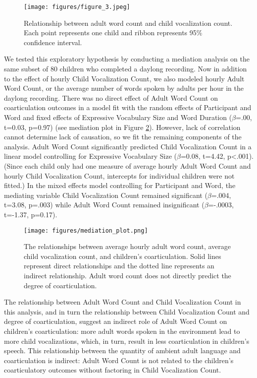 \documentclass[a4paper,man,natbib,donotrepeattitle, apacite]{apa6}
\begin{document}
\begin{figure}[H]
\centering
\texttt{[image: figures/figure\_3.jpeg]}
\caption{\label{fig:figure-3}Relationship between adult word count and child vocalization count. Each point represents one child and ribbon represents 95\% confidence interval.}
\end{figure}

We tested this exploratory hypothesis by conducting a mediation analysis on the same subset of 80 children who completed a daylong recording. Now in addition to the effect of hourly Child Vocalization Count, we also modeled hourly Adult Word Count, or the average number of words spoken by adults per hour in the daylong recording. There was no direct effect of Adult Word Count on coarticulation outcomes in a model fit with the random effects of Participant and Word and fixed effects of Expressive Vocabulary Size and Word Duration ($\beta$=.00, t=0.03, p=0.97) (see mediation plot in Figure \ref{fig:mediation}). However, lack of correlation cannot determine lack of causation, so we fit the remaining components of the analysis. Adult Word Count significantly predicted  Child Vocalization Count in a linear model controlling for Expressive Vocabulary Size ($\beta$=0.08, t=4.42, p<.001). (Since each child only had one measure of average hourly Adult Word Count and hourly Child Vocalization Count, intercepts for individual children were not fitted.) In the mixed effects model controlling for Participant and Word, the mediating variable Child Vocalization Count remained significant ($\beta$=.004, t=3.08, p=.003) while Adult Word Count remained insignificant ($\beta$=-.0003, t=-1.37, p=0.17). 

\begin{figure}[H]
\centering
\texttt{[image: figures/mediation\_plot.png]}
\caption{\label{fig:mediation}The relationships between average hourly adult word count, average child vocalization count, and children's coarticulation. Solid lines represent direct relationships and the dotted line represents an indirect relationship. Adult word count does not directly predict the degree of coarticulation.}
\end{figure}

The relationship between Adult Word Count and Child Vocalization Count in this analysis, and in turn the relationship between Child Vocalization Count and degree of coarticulation, suggest an indirect role of Adult Word Count on children’s coarticulation: more adult words spoken in the environment lead to more child vocalizations, which, in turn, result in less coarticulation in children's speech. This relationship between the quantity of ambient adult language and coarticulation is indirect: Adult Word Count is not related to the children’s coarticulatory outcomes without factoring in Child Vocalization Count.  
\end{document}
